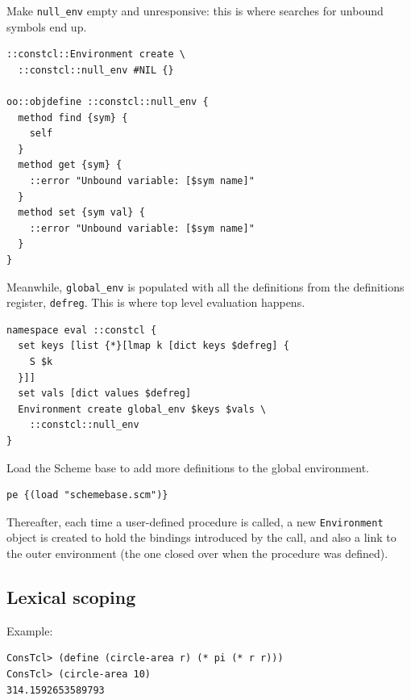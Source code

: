 \documentclass[twoside,9pt]{report}
\begin{document}
Make \texttt{null\_env} empty and unresponsive: this is where searches for unbound symbols end up.

\noindent\makebox[\linewidth]{\rule{\linewidth}{0.4pt}}
\begin{lstlisting}
::constcl::Environment create \
  ::constcl::null_env #NIL {}
 
oo::objdefine ::constcl::null_env {
  method find {sym} {
    self
  }
  method get {sym} {
    ::error "Unbound variable: [$sym name]"
  }
  method set {sym val} {
    ::error "Unbound variable: [$sym name]"
  }
}
\end{lstlisting}
\noindent\makebox[\linewidth]{\rule{\linewidth}{0.4pt}}

Meanwhile, \texttt{global\_env} is populated with all the definitions from the definitions register, \texttt{defreg}. This is where top level evaluation happens.

\noindent\makebox[\linewidth]{\rule{\linewidth}{0.4pt}}
\begin{lstlisting}
namespace eval ::constcl {
  set keys [list {*}[lmap k [dict keys $defreg] {
    S $k
  }]]
  set vals [dict values $defreg]
  Environment create global_env $keys $vals \
    ::constcl::null_env
}
\end{lstlisting}
\noindent\makebox[\linewidth]{\rule{\linewidth}{0.4pt}}

Load the Scheme base to add more definitions to the global environment.

\noindent\makebox[\linewidth]{\rule{\linewidth}{0.4pt}}
\begin{lstlisting}
pe {(load "schemebase.scm")}
\end{lstlisting}
\noindent\makebox[\linewidth]{\rule{\linewidth}{0.4pt}}

Thereafter, each time a user-defined procedure is called, a new \texttt{Environment} object is created to hold the bindings introduced by the call, and also a link to the outer environment (the one closed over when the procedure was defined).

\subsection{Lexical scoping}
\label{lexical-scoping}

Example:

\noindent\makebox[\linewidth]{\rule{\linewidth}{0.4pt}}
\begin{lstlisting}
ConsTcl> (define (circle-area r) (* pi (* r r)))
ConsTcl> (circle-area 10)
314.1592653589793
\end{lstlisting}
\noindent\makebox[\linewidth]{\rule{\linewidth}{0.4pt}}
\end{document}
